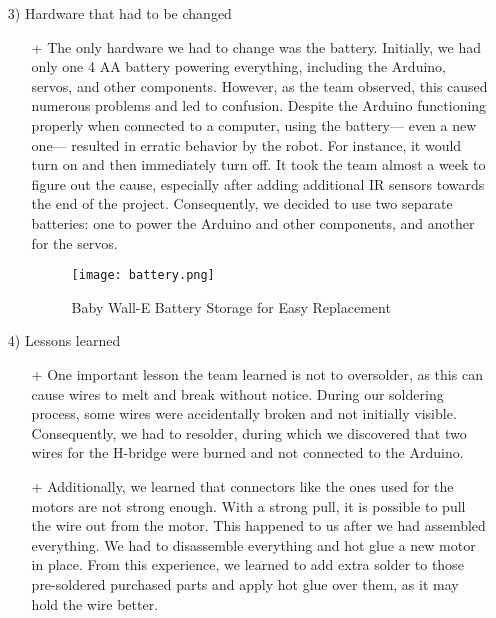 \documentclass[12pt]{article}
\begin{document}
\begin{itemize}
\begin{itemize}
\begin{itemize}
            \item[3)] Hardware that had to be changed
            \begin{enumerate}
                \item[+] The only hardware we had to change was the battery. Initially, we had only one 4 AA battery powering everything, including the Arduino, servos, and other components.
                However, as the team observed, this caused numerous problems and led to confusion. Despite the Arduino functioning properly when connected to a computer, using the battery— even a new one— resulted in erratic behavior by the robot. For instance, it would turn on and then immediately turn off. It took the team almost a week to figure out the cause, especially after adding additional IR sensors towards the end of the project. Consequently, we decided to use two separate batteries: one to power the Arduino and other components, and another for the servos.
                \begin{figure}[H]
                    \centering
                    \texttt{[image: battery.png]}
                    \caption{Baby Wall-E Battery Storage for Easy Replacement}
                    \label{fig:battery}
                \end{figure}
            \end{enumerate}
            
            \item[4)] Lessons learned
            \begin{enumerate}
                \item[+] One important lesson the team learned is not to oversolder, as this can cause wires to melt and break without notice. During our soldering process, some wires were accidentally broken and not initially visible. Consequently, we had to resolder, during which we discovered that two wires for the H-bridge were burned and not connected to the Arduino.
                \item[+] Additionally, we learned that connectors like the ones used for the motors are not strong enough. With a strong pull, it is possible to pull the wire out from the motor. This happened to us after we had assembled everything. We had to disassemble everything and hot glue a new motor in place. From this experience, we learned to add extra solder to those pre-soldered purchased parts and apply hot glue over them, as it may hold the wire better.
            \end{enumerate}


\end{itemize}
\end{itemize}
\end{itemize}
\end{document}
